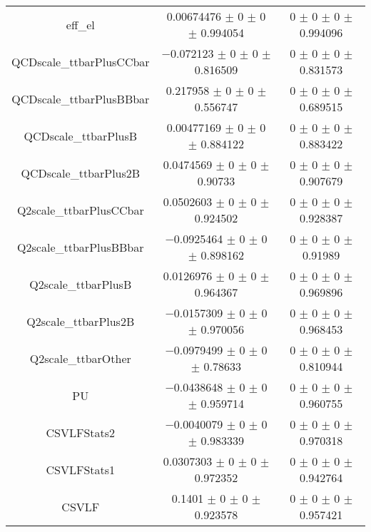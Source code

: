 \begin{table}
\begin{tabular}{ccc}
eff\_el 	& \num{0.00674476} $\pm$ \num{0} $\pm$ \num{0} $\pm$ \num{0.994054} 	& \num{0} $\pm$ \num{0} $\pm$ \num{0} $\pm$ \num{0.994096}\\
QCDscale\_ttbarPlusCCbar 	& \num{-0.072123} $\pm$ \num{0} $\pm$ \num{0} $\pm$ \num{0.816509} 	& \num{0} $\pm$ \num{0} $\pm$ \num{0} $\pm$ \num{0.831573}\\
QCDscale\_ttbarPlusBBbar 	& \num{0.217958} $\pm$ \num{0} $\pm$ \num{0} $\pm$ \num{0.556747} 	& \num{0} $\pm$ \num{0} $\pm$ \num{0} $\pm$ \num{0.689515}\\
QCDscale\_ttbarPlusB 	& \num{0.00477169} $\pm$ \num{0} $\pm$ \num{0} $\pm$ \num{0.884122} 	& \num{0} $\pm$ \num{0} $\pm$ \num{0} $\pm$ \num{0.883422}\\
QCDscale\_ttbarPlus2B 	& \num{0.0474569} $\pm$ \num{0} $\pm$ \num{0} $\pm$ \num{0.90733} 	& \num{0} $\pm$ \num{0} $\pm$ \num{0} $\pm$ \num{0.907679}\\
Q2scale\_ttbarPlusCCbar 	& \num{0.0502603} $\pm$ \num{0} $\pm$ \num{0} $\pm$ \num{0.924502} 	& \num{0} $\pm$ \num{0} $\pm$ \num{0} $\pm$ \num{0.928387}\\
Q2scale\_ttbarPlusBBbar 	& \num{-0.0925464} $\pm$ \num{0} $\pm$ \num{0} $\pm$ \num{0.898162} 	& \num{0} $\pm$ \num{0} $\pm$ \num{0} $\pm$ \num{0.91989}\\
Q2scale\_ttbarPlusB 	& \num{0.0126976} $\pm$ \num{0} $\pm$ \num{0} $\pm$ \num{0.964367} 	& \num{0} $\pm$ \num{0} $\pm$ \num{0} $\pm$ \num{0.969896}\\
Q2scale\_ttbarPlus2B 	& \num{-0.0157309} $\pm$ \num{0} $\pm$ \num{0} $\pm$ \num{0.970056} 	& \num{0} $\pm$ \num{0} $\pm$ \num{0} $\pm$ \num{0.968453}\\
Q2scale\_ttbarOther 	& \num{-0.0979499} $\pm$ \num{0} $\pm$ \num{0} $\pm$ \num{0.78633} 	& \num{0} $\pm$ \num{0} $\pm$ \num{0} $\pm$ \num{0.810944}\\
PU 	& \num{-0.0438648} $\pm$ \num{0} $\pm$ \num{0} $\pm$ \num{0.959714} 	& \num{0} $\pm$ \num{0} $\pm$ \num{0} $\pm$ \num{0.960755}\\
CSVLFStats2 	& \num{-0.0040079} $\pm$ \num{0} $\pm$ \num{0} $\pm$ \num{0.983339} 	& \num{0} $\pm$ \num{0} $\pm$ \num{0} $\pm$ \num{0.970318}\\
CSVLFStats1 	& \num{0.0307303} $\pm$ \num{0} $\pm$ \num{0} $\pm$ \num{0.972352} 	& \num{0} $\pm$ \num{0} $\pm$ \num{0} $\pm$ \num{0.942764}\\
CSVLF 	& \num{0.1401} $\pm$ \num{0} $\pm$ \num{0} $\pm$ \num{0.923578} 	& \num{0} $\pm$ \num{0} $\pm$ \num{0} $\pm$ \num{0.957421}\\

\end{tabular}
\end{table}

